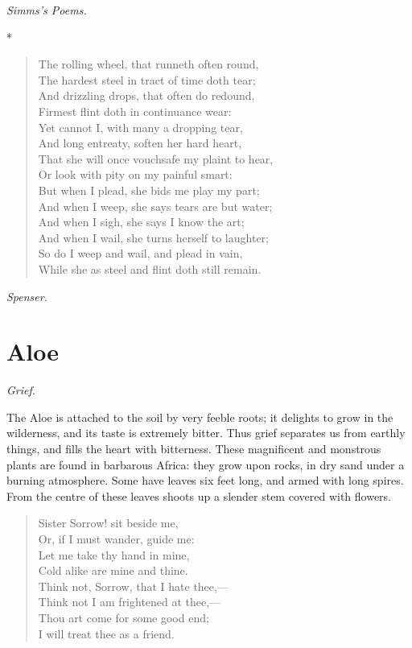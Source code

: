 \documentclass[11pt,twoside]{article}
\newcommand\flower[2]{\section*{#1}\addcontentsline{toc}{section}{#1}%
  \noindent\textit{#2.}\par\medskip}
\newcommand\stars{\begin{center}*\quad*\quad*\end{center}}
\newcommand\by[1]{\par\hfill\textit{#1}\par}
\begin{document}
\by{Simms’s Poems.}

\stars

\begin{verse}
The rolling wheel, that runneth often round,\\
The hardest steel in tract of time doth tear;\\
And drizzling drops, that often do redound,\\
Firmest flint doth in continuance wear:\\
Yet cannot I, with many a dropping tear,\\
And long entreaty, soften her hard heart,\\
That she will once vouchsafe my plaint to hear,\\
Or look with pity on my painful smart:\\
But when I plead, she bids me play my part;\\
And when I weep, she says tears are but water;\\
And when I sigh, she says I know the art;\\
And when I wail, she turns herself to laughter;\\
So do I weep and wail, and plead in vain,\\
While she as steel and flint doth still remain.
\end{verse}

\by{Spenser.}

\flower{Aloe}{Grief}

The Aloe is attached to the soil by very feeble roots; it delights to grow in the wilderness, and its taste is extremely bitter. Thus grief separates us from earthly things, and fills the heart with bitterness. These magnificent and monstrous plants are found in barbarous Africa: they grow upon rocks, in dry sand under a burning atmosphere. Some have leaves six feet long, and armed with long spires. From the centre of these leaves shoots up a slender stem covered with flowers.

\begin{verse}
Sister Sorrow! sit beside me,\\
Or, if I must wander, guide me:\\
Let me take thy hand in mine,\\
Cold alike are mine and thine.\\
Think not, Sorrow, that I hate thee,---\\
Think not I am frightened at thee,---\\
Thou art come for some good end;\\
I will treat thee as a friend.
\end{verse}
\end{document}
